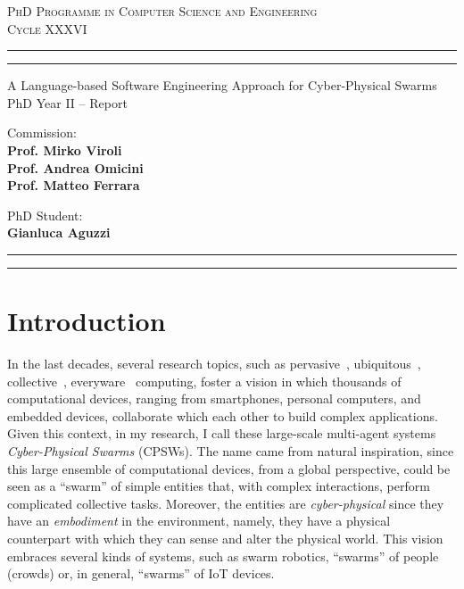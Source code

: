 \documentclass[11pt]{article}
\begin{document}
\sloppy
\begin{center}
	{{
		\Large{
			\textsc{PhD Programme in Computer Science and Engineering \\ 
			\vspace{4mm}
			Cycle XXXVI}
			}
	}} 
	\rule[0.1cm]{\textwidth}{0.1mm}
	\rule[0.4cm]{\textwidth}{0.6mm}
\end{center}

\begin{center}
	{\LARGE{A Language-based Software Engineering Approach for Cyber-Physical Swarms}} \\
	\vspace{4mm}
	{\large{PhD Year II -- Report}} 
	\vspace{4mm}
\end{center}
\vspace{8mm}
\par
\noindent
\begin{minipage}[t]{0.47\textwidth}

{\large{Commission: \\\bf
Prof. Mirko Viroli \\
Prof. Andrea Omicini \\
Prof. Matteo Ferrara} 
}
\end{minipage}
\hfill
\begin{minipage}[t]{0.47\textwidth}
	\raggedleft
	{
		\large{PhD Student: \\\bf Gianluca Aguzzi}
	}
\end{minipage}
\vspace{10mm}

{
	\raggedright
	\rule[0.1cm]{\textwidth}{0.6mm}
	\rule[0.5cm]{\textwidth}{0.1mm}
}

\newcommand{\rev}[1]{{
	#1
	}}
\section{Introduction}
In the last decades, several research topics, such as pervasive~\cite{pervasive}, 
 ubiquitous~\cite{weiser1999computer}, collective~\cite{abowd2016beyond}, everyware~\cite{greenfield2010everyware} computing, 
 foster a vision in which thousands of computational devices, 
 ranging from smartphones, personal computers, and embedded devices,
 collaborate which each other to build complex applications.
%
Given this context, in my research, I call these large-scale multi-agent systems \textit{Cyber-Physical Swarms} (CPSWs).
%
The name came from natural inspiration, since this large ensemble of computational devices, 
 from a global perspective, could be seen as a ``swarm'' of simple entities that, with complex interactions, 
 perform complicated collective tasks.
%
Moreover, the entities are \textit{cyber-physical} since they have an \textit{embodiment} in the environment, 
 namely, they have a physical counterpart with which they can sense and alter the physical world.
%
This vision embraces several kinds of systems, such as
 swarm robotics, ``swarms'' of people (crowds) or, in general, ``swarms'' of IoT devices.
\end{document}
